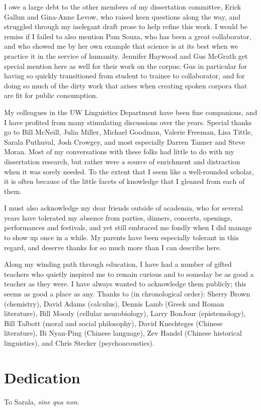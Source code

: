 I owe a large debt to the other members of my dissertation committee, Erick Gallun and Gina-Anne Levow, who raised keen questions along the way, and struggled through my inelegant draft prose to help refine this work.  I would be remiss if I failed to also mention Pam Souza, who has been a great collaborator, and who showed me by her own example that science is at its best when we practice it in the service of humanity.  Jennifer Haywood and Gus McGrath get special mention here as well for their work on the corpus; Gus in particular for having so quickly transitioned from student to trainee to collaborator, and for doing so much of the dirty work that arises when creating spoken corpora that are fit for public consumption.

My colleagues in the UW Linguistics Department have been fine companions, and I have profited from many stimulating discussions over the years.  Special thanks go to Bill McNeill, Julia Miller, Michael Goodman, Valerie Freeman, Lisa Tittle, Sarala Puthuval, Josh Crowgey, and most especially Darren Tanner and Steve Moran.  Most of my conversations with these folks had little to do with my dissertation research, but rather were a source of enrichment and distraction when it was sorely needed.  To the extent that I seem like a well-rounded scholar, it is often because of the little facets of knowledge that I gleaned from each of them.  

I must also acknowledge my dear friends outside of academia, who for several years have tolerated my absence from parties, dinners, concerts, openings, performances and festivals, and yet still embraced me fondly when I did manage to show up once in a while.  My parents have been especially tolerant in this regard, and deserve thanks for so much more than I can describe here.

Along my winding path through education, I have had a number of gifted teachers who quietly inspired me to remain curious and to someday be as good a teacher as they were.  I have always wanted to acknowledge them publicly; this seems as good a place as any.  Thanks to (in chronological order): Sherry Brown (chemistry), David Adams (calculus), Dennis Lamb (Greek and Roman literature), Bill Moody (cellular neurobiology), Larry BonJour (epistemology), Bill Talbott (moral and social philosophy), David Knechteges (Chinese literature), Bi Nyan-Ping (Chinese language), Zev Handel (Chinese historical linguistics), and Chris Stecker (psychoacoustics).

\chapter*{Dedication}
To Sarala, \textit{sine qua non}.

